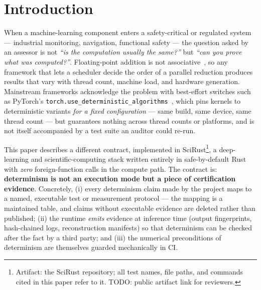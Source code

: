\documentclass[sigconf,review]{acmart}
\begin{document}

\maketitle

\section{Introduction}

When a machine-learning component enters a safety-critical or regulated
system --- industrial monitoring, navigation, functional safety --- the
question asked by an assessor is not \emph{``is the computation usually the
same?''} but \emph{``can you prove what was computed?''}. Floating-point
addition is not associative~\cite{goldberg1991}, so any framework that lets
a scheduler decide the order of a parallel reduction produces results that
vary with thread count, machine load, and hardware generation. Mainstream
frameworks acknowledge the problem with best-effort switches such as
PyTorch's \texttt{torch.use\_deterministic\_algorithms}~\cite{pytorchdet},
which pins kernels to deterministic variants \emph{for a fixed
configuration} --- same build, same device, same thread count --- but
guarantees nothing across thread counts or platforms, and is not itself
accompanied by a test suite an auditor could re-run.

This paper describes a different contract, implemented in
SciRust\footnote{Artifact: the SciRust repository; all test names, file
paths, and commands cited in this paper refer to it. TODO: public artifact
link for reviewers.}, a deep-learning and scientific-computing stack written
entirely in safe-by-default Rust with \emph{zero} foreign-function calls in
the compute path. The contract is: \textbf{determinism is not an execution
mode but a piece of certification evidence}. Concretely, (i) every
determinism claim made by the project maps to a named, executable test or
measurement protocol --- the mapping is a maintained table, and claims
without executable evidence are deleted rather than published; (ii) the
runtime \emph{emits} evidence at inference time (output fingerprints,
hash-chained logs, reconstruction manifests) so that determinism can be
checked after the fact by a third party; and (iii) the numerical
preconditions of determinism are themselves guarded mechanically in CI.
\end{document}
